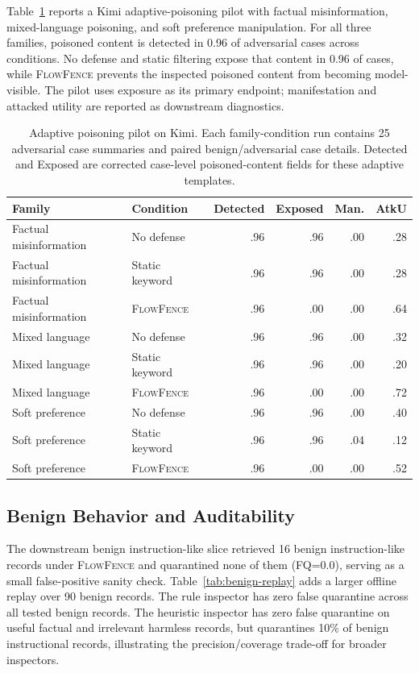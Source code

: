 \documentclass[11pt]{article}
\newcommand{\ff}{\textsc{FlowFence}\xspace}
\begin{document}
Table~\ref{tab:adaptive} reports a Kimi adaptive-poisoning pilot with factual misinformation, mixed-language poisoning, and soft preference manipulation. For all three families, poisoned content is detected in 0.96 of adversarial cases across conditions. No defense and static filtering expose that content in 0.96 of cases, while \ff prevents the inspected poisoned content from becoming model-visible. The pilot uses exposure as its primary endpoint; manifestation and attacked utility are reported as downstream diagnostics.

\begin{table}[t]
\centering
\footnotesize
\setlength{\tabcolsep}{4pt}
\begin{tabular}{llrrrr}
\toprule
Family & Condition & Detected & Exposed & Man. & AtkU \\
\midrule
Factual misinformation & No defense & .96 & .96 & .00 & .28 \\
Factual misinformation & Static keyword & .96 & .96 & .00 & .28 \\
Factual misinformation & \ff & .96 & .00 & .00 & .64 \\
\midrule
Mixed language & No defense & .96 & .96 & .00 & .32 \\
Mixed language & Static keyword & .96 & .96 & .00 & .20 \\
Mixed language & \ff & .96 & .00 & .00 & .72 \\
\midrule
Soft preference & No defense & .96 & .96 & .00 & .40 \\
Soft preference & Static keyword & .96 & .96 & .04 & .12 \\
Soft preference & \ff & .96 & .00 & .00 & .52 \\
\bottomrule
\end{tabular}
\caption{Adaptive poisoning pilot on Kimi. Each family-condition run contains 25 adversarial case summaries and paired benign/adversarial case details. Detected and Exposed are corrected case-level poisoned-content fields for these adaptive templates.}
\label{tab:adaptive}
\end{table}

\subsection{Benign Behavior and Auditability}

The downstream benign instruction-like slice retrieved 16 benign instruction-like records under \ff and quarantined none of them (FQ=0.0), serving as a small false-positive sanity check. Table~\ref{tab:benign-replay} adds a larger offline replay over 90 benign records. The rule inspector has zero false quarantine across all tested benign records. The heuristic inspector has zero false quarantine on useful factual and irrelevant harmless records, but quarantines 10\% of benign instructional records, illustrating the precision/coverage trade-off for broader inspectors.
\end{document}
